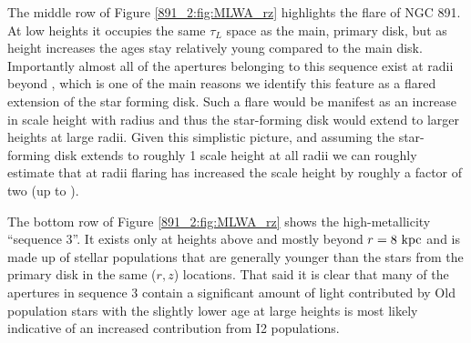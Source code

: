 
The middle row of Figure \ref{891_2:fig:MLWA_rz} highlights the flare of NGC
891. At low heights it occupies the same $\tau_L$ space as the main,
primary disk, but as height increases the ages stay relatively young
compared to the main disk. Importantly almost all of the apertures
belonging to this sequence exist at radii beyond , which
is one of the main reasons we identify this feature as a flared
extension of the star forming disk. Such a flare would be manifest as
an increase in scale height with radius and thus the star-forming disk
would extend to larger heights at large radii. Given this simplistic
picture, and assuming the star-forming disk extends to roughly 1 scale
height at all radii we can roughly estimate that at radii  flaring has increased the scale height by roughly a factor
of two (up to ).


The bottom row of Figure \ref{891_2:fig:MLWA_rz} shows the high-metallicity
``sequence 3''. It exists only at heights above  and
mostly beyond $r = 8~\mathrm{kpc} $ and is made up of stellar populations
that are generally younger than the stars from the primary disk
in the same ($r,z$) locations. That said it is clear that many of the
apertures in sequence 3 contain a significant amount of light
contributed by Old population stars with the slightly lower age at large
heights is most likely indicative of an increased contribution from I2
populations.



